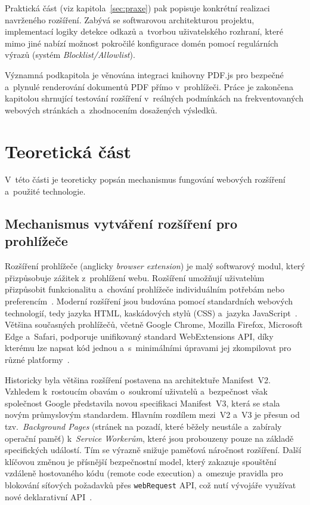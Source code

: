 \documentclass[a4paper,12pt]{article}
\begin{document}
Praktická část (viz kapitola~\ref{sec:praxe}) pak popisuje konkrétní realizaci navrženého rozšíření. Zabývá se softwarovou architekturou projektu, implementací logiky detekce odkazů a~tvorbou uživatelského rozhraní, které mimo jiné nabízí možnost pokročilé konfigurace domén pomocí regulárních výrazů (systém \textit{Blocklist/Allowlist}). 

Významná podkapitola je věnována integraci knihovny PDF.js pro bezpečné a~plynulé renderování dokumentů PDF přímo v~prohlížeči. Práce je zakončena kapitolou shrnující testování rozšíření v~reálných podmínkách na frekventovaných webových stránkách a~zhodnocením dosažených výsledků.


\section{Teoretická část}
\label{sec:teorie}

V~této části je teoreticky popsán mechanismus fungování webových rozšíření a~použité technologie.

\subsection{Mechanismus vytváření rozšíření pro prohlížeče}
\label{subsec:teorie_rozsireni}

Rozšíření prohlížeče (anglicky \textit{browser extension}) je malý softwarový modul, který přizpůsobuje zážitek z~prohlížení webu. Rozšíření umožňují uživatelům přizpůsobit funkcionalitu a~chování prohlížeče individuálním potřebám nebo preferencím~\autocite{mdn_extensions}. Moderní rozšíření jsou budována pomocí standardních webových technologií, tedy jazyka HTML, kaskádových stylů (CSS) a~jazyka JavaScript~\autocite{flanagan2020}. Většina současných prohlížečů, včetně Google Chrome, Mozilla Firefox, Microsoft Edge a~Safari, podporuje unifikovaný standard WebExtensions API, díky kterému lze napsat kód jednou a~s~minimálními úpravami jej zkompilovat pro různé platformy~\autocite{frisbie2025}.

Historicky byla většina rozšíření postavena na architektuře Manifest~V2. Vzhledem k~rostoucím obavám o~soukromí uživatelů a~bezpečnost však společnost Google představila novou specifikaci Manifest~V3, která se stala novým průmyslovým standardem. Hlavním rozdílem mezi~V2 a~V3 je přesun od tzv.~\textit{Background Pages} (stránek na pozadí, které běžely neustále a~zabíraly operační paměť) k~\textit{Service Workerům}, které jsou probouzeny pouze na základě specifických událostí. Tím se výrazně snižuje paměťová náročnost rozšíření. Další klíčovou změnou je přísnější bezpečnostní model, který zakazuje spouštění vzdáleně hostovaného kódu (remote code execution) a~omezuje pravidla pro blokování síťových požadavků přes \texttt{webRequest} API, což nutí vývojáře využívat nové deklarativní API~\autocite{chrome_api}.
\end{document}

